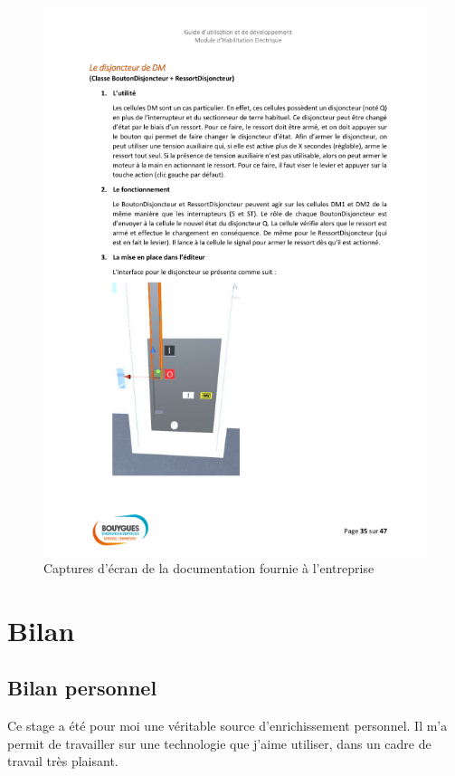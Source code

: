 \documentclass[a4paper]{article}
\begin{document}
\begin{figure}[H]
        \includegraphics[scale=0.35]{img/DocTechnique2}
        \caption{Captures d'écran de la documentation fournie à l'entreprise}
    \end{figure}

    \section{Bilan}
    
    \subsection{Bilan personnel}

        Ce stage a été pour moi une véritable source d'enrichissement personnel. Il m'a permit de travailler sur une technologie que j'aime utiliser, dans un cadre de travail très plaisant. \\
\end{document}
